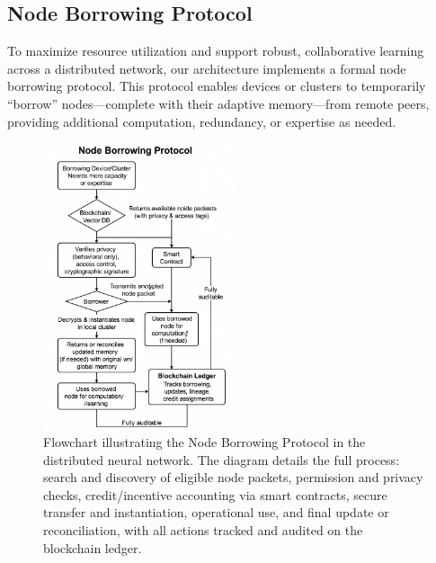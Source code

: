 \documentclass[11pt]{article}
\begin{document}
\subsection{Node Borrowing Protocol}

To maximize resource utilization and support robust, collaborative learning across a distributed network, our architecture implements a formal node borrowing protocol. This protocol enables devices or clusters to temporarily “borrow” nodes—complete with their adaptive memory—from remote peers, providing additional computation, redundancy, or expertise as needed.

\begin{figure}[ht]
    \centering
    \includegraphics[width=0.5\textwidth]{architecture_diagrams/node-borrowing.png}
    \caption{
        Flowchart illustrating the Node Borrowing Protocol in the distributed neural network. The diagram details the full process: search and discovery of eligible node packets, permission and privacy checks, credit/incentive accounting via smart contracts, secure transfer and instantiation, operational use, and final update or reconciliation, with all actions tracked and audited on the blockchain ledger.
    }
    \label{fig:node-borrowing-protocol}
\end{figure}
\end{document}
